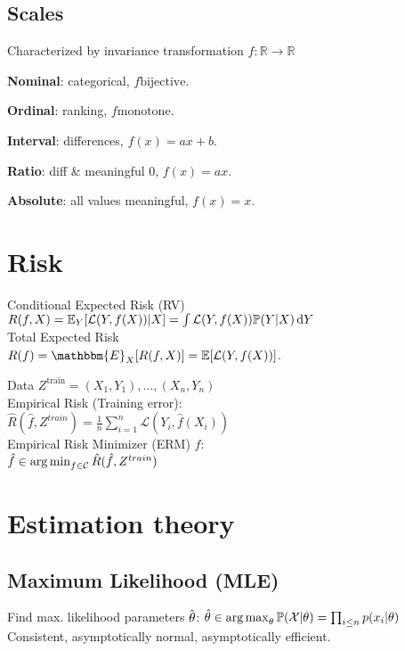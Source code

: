 \subsection*{Scales}

Characterized by invariance transformation $f: \mathbb{R} \rightarrow \mathbb{R}$

\textbf{Nominal}: categorical, $f \textrm{bijective}$.

\textbf{Ordinal}: ranking, $f \textrm{monotone}$.

\textbf{Interval}: differences, $f(x) = ax + b$.

\textbf{Ratio}: diff \& meaningful 0, $f(x) = ax$.

\textbf{Absolute}: all values meaningful, $f(x) = x$. 

\section*{Risk}
Conditional Expected Risk (RV)\\
$R(f, X) = \mathbb{E}_Y[\mathcal{L}(Y,f(X))|X] = \int \mathcal{L}(Y,f(X))\mathbb{P}(Y|X)\operatorname{d\!} Y$\\
Total Expected Risk\\
$R(f) = \mathbbm{E}_{X}[R(f,X)] = \E[\mathcal{L}(Y, f(X))]$.

Data $Z^\text{train}={(X_1,Y_1),...,(X_n,Y_n)}$ \\
Empirical Risk (Training error):\\
$\hat{R}(\hat{f}, Z^{train}) = \frac{1}{n} \sum_{i=1}^n \mathcal{L}(Y_i, \hat{f}(X_i))$\\
Empirical Risk Minimizer (ERM) $\hat{f}$:\\
$\hat{f} \in \operatorname*{arg\,min}_{f \in \mathcal{C}} \hat{R}(\hat{f}, Z^{train})$\\

\section*{Estimation theory}

\subsection*{Maximum Likelihood (MLE)}
Find  max. likelihood parameters $\hat{\kern0pt \theta}$:
$\hat{\theta}\in \operatorname*{arg\,max}_\theta \mathbb{P}(\mathcal{X}|\theta) =\prod_{i\leq n}p(x_i|\theta)$\\
Consistent, asymptotically normal, asymptotically efficient.

